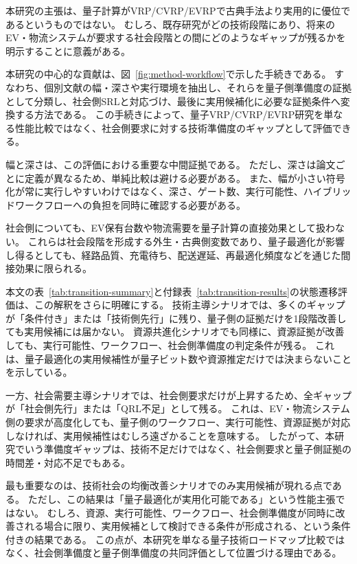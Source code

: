 本研究の主張は、量子計算がVRP/CVRP/EVRPで古典手法より実用的に優位であるというものではない。
むしろ、既存研究がどの技術段階にあり、将来のEV・物流システムが要求する社会段階との間にどのようなギャップが残るかを明示することに意義がある。

本研究の中心的な貢献は、図~\ref{fig:method-workflow}で示した手続きである。
すなわち、個別文献の幅・深さや実行環境を抽出し、それらを量子側準備度の証拠として分類し、社会側SRLと対応づけ、最後に実用候補化に必要な証拠条件へ変換する方法である。
この手続きによって、量子VRP/CVRP/EVRP研究を単なる性能比較ではなく、社会側要求に対する技術準備度のギャップとして評価できる。

幅と深さは、この評価における重要な中間証拠である。
ただし、深さは論文ごとに定義が異なるため、単純比較は避ける必要がある。
また、幅が小さい符号化が常に実行しやすいわけではなく、深さ、ゲート数、実行可能性、ハイブリッドワークフローへの負担を同時に確認する必要がある。

社会側についても、EV保有台数や物流需要を量子計算の直接効果として扱わない。
これらは社会段階を形成する外生・古典側変数であり、量子最適化が影響し得るとしても、経路品質、充電待ち、配送遅延、再最適化頻度などを通じた間接効果に限られる。

本文の表~\ref{tab:transition-summary}と付録表~\ref{tab:transition-results}の状態遷移評価は、この解釈をさらに明確にする。
技術主導シナリオでは、多くのギャップが「条件付き」または「技術側先行」に残り、量子側の証拠だけを1段階改善しても実用候補には届かない。
資源共進化シナリオでも同様に、資源証拠が改善しても、実行可能性、ワークフロー、社会側準備度の判定条件が残る。
これは、量子最適化の実用候補性が量子ビット数や資源推定だけでは決まらないことを示している。

一方、社会需要主導シナリオでは、社会側要求だけが上昇するため、全ギャップが「社会側先行」または「QRL不足」として残る。
これは、EV・物流システム側の要求が高度化しても、量子側のワークフロー、実行可能性、資源証拠が対応しなければ、実用候補性はむしろ遠ざかることを意味する。
したがって、本研究でいう準備度ギャップは、技術不足だけではなく、社会側要求と量子側証拠の時間差・対応不足でもある。

最も重要なのは、技術社会の均衡改善シナリオでのみ実用候補が現れる点である。
ただし、この結果は「量子最適化が実用化可能である」という性能主張ではない。
むしろ、資源、実行可能性、ワークフロー、社会側準備度が同時に改善される場合に限り、実用候補として検討できる条件が形成される、という条件付きの結果である。
この点が、本研究を単なる量子技術ロードマップ比較ではなく、社会側準備度と量子側準備度の共同評価として位置づける理由である。

